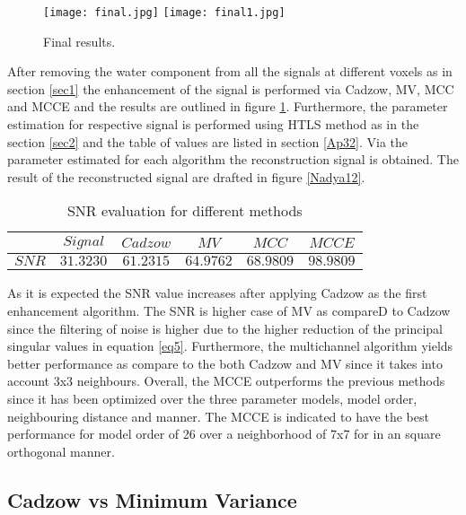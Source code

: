\begin{figure}[!htbp]
%
\centering
\texttt{[image: final.jpg]}
\label{Nadya12}
\endminipage\hfill
{}%
\centering
\texttt{[image: final1.jpg]}
\label{Nadya11}
\endminipage\hfill
\caption{Final results. }
\end{figure}


After removing the water component from all the signals at different voxels as in section \ref{sec1} the enhancement of the signal is performed via Cadzow, MV, MCC and MCCE and the results are outlined in figure \ref{Nadya11}. Furthermore, the parameter estimation for respective signal is performed using HTLS method as in the section \ref{sec2} and the table of values are listed in section \ref{Ap32}. Via the parameter estimated for each algorithm the reconstruction signal is obtained. The result of the reconstructed signal are drafted in figure \ref{Nadya12}. 





 \begin{table}[!htbp]
\centering
\caption{SNR evaluation for different methods}\label{tab11}

\begin{tabular}{c c c c c c} 
\hline 
$ $&$Signal$&$Cadzow$&$MV$&$MCC$&$MCCE$ \\
\hline 
$SNR$&$ 31.3230$&$ 61.2315$&$ 64.9762$&$ 68.9809$&$ 98.9809$\\
\hline 
\end{tabular}
\end{table}

As it is expected the SNR value increases after applying Cadzow as the first enhancement algorithm. The SNR is higher case of MV as compareD to Cadzow since the filtering of noise is higher due to the higher reduction of the principal singular values in equation \ref{eq5}. Furthermore, the multichannel algorithm yields better performance as compare to the both Cadzow and MV since it takes into account 3x3 neighbours. Overall, the MCCE outperforms the previous methods since it has been optimized over the three parameter models, model order, neighbouring distance and manner. The MCCE is indicated to have the best performance for model order of 26 over a neighborhood of 7x7 for in an square orthogonal manner.


\subsection{Cadzow vs Minimum Variance}

